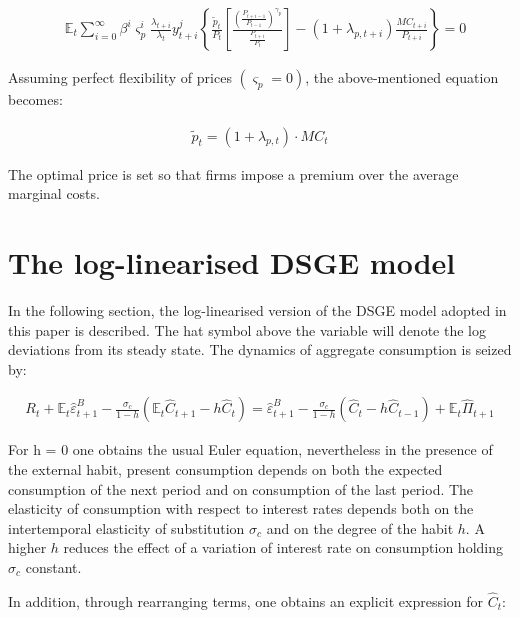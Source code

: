 \documentclass{pracamgr}
\numberwithin{equation}{section}
\begin{document}
\begin{align}
&\mathbb{E}_{t}  \sum\limits_{i=0}^{\infty} \beta^{i} \varsigma_{p}^{i} \frac{\lambda_{t+i}}{\lambda_{t}} y_{t+i}^{j} \left\{ \frac{\widetilde{p}_{t}}{P_{t}} \left[ \frac{ \left(\frac{P_{t+i-1}}{P_{t-1}} \right)^{\gamma_{p}}}{\frac{P_{t+i}}{P_{t}}} \right] - (1+\lambda_{p,t+i})\frac{MC_{t+i}}{P_{t+i}} \right\} = 0
\end{align}

Assuming perfect flexibility of prices $(\varsigma_{p} = 0)$, the above-mentioned equation becomes:

\begin{align}
\widetilde{p}_{t} = \left(1 + \lambda_{p, t} \right) \cdot MC_{t}
\end{align}

The optimal price is set so that firms impose a premium over the average marginal costs.

\section{The log-linearised DSGE model} \label{The log-linerised DSGE model}

In the following section, the log-linearised version of the DSGE model adopted in this paper is described. The hat symbol above the variable will denote the log deviations from its steady state. The dynamics of aggregate consumption is seized by:

\begin{align}
R_{t} + \mathbb{E}_{t} \hat{\varepsilon}^{B}_{t+1} - \frac{\sigma_{c}}{1-h} \left( \mathbb{E}_{t}\hat{C}_{t+1} - h \hat{C}_{t} \right) = \hat{\varepsilon}^{B}_{t+1} - \frac{\sigma_{c}}{1-h} \left( \hat{C}_{t} - h \hat{C}_{t-1} \right) + \mathbb{E}_{t} \hat{\Pi}_{t+1}
\end{align}

For h = 0 one obtains the usual Euler equation, nevertheless in the presence of the external habit, present consumption depends on both the expected consumption of the next period and on consumption of the last period. The elasticity of consumption with respect to interest rates depends both on the intertemporal elasticity of substitution $\sigma_{c}$ and on the degree of the habit $h$. A higher $h$ reduces the effect of a variation of interest rate on consumption holding $\sigma_{c}$ constant.

In addition, through rearranging terms, one obtains an explicit expression for $\hat{C}_{t}$:
\end{document}
